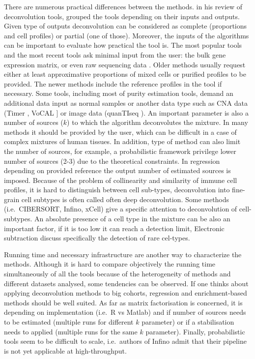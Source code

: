 \documentclass[12pt,]{book}
\theoremstyle{definition}
\theoremstyle{definition}
\theoremstyle{definition}
\theoremstyle{remark}
\begin{document}
There are numerous practical differences between the methods.
\citet{Shen-Orr2013} in his review of deconvolution tools, grouped the
tools depending on their inputs and outputs. Given type of outputs
deconvolution can be considered as complete (proportions and cell
profiles) or partial (one of those). Moreover, the inputs of the
algorithms can be important to evaluate how practical the tool is. The
most popular tools and the most recent tools ask minimal input from the
user: the bulk gene expression matrix, or even raw sequencing data
\citep{Finotello2017}. Older methods usually request either at least
approximative proportions of mixed cells or purified profiles to be
provided. The newer methods include the reference profiles in the tool
if necessary. Some tools, including most of purity estimation tools,
demand an additional data input as normal samples or another data type
such as CNA data (Timer \citep{Li2013}, VoCAL \citep{Steuerman2016}{]}
or image data (quanTIseq \citep{Finotello2017}). An important parameter
is also a number of sources (\(k\)) to which the algorithm deconvolutes
the mixture. In many methods it should be provided by the user, which
can be difficult in a case of complex mixtures of human tissues. In
addition, type of method can also limit the number of sources, for
example, a probabilistic framework privilege lower number of sources
(2-3) due to the theoretical constraints. In regression depending on
provided reference the output number of estimated sources is imposed.
Because of the problem of collinearity and similarity of immune cell
profiles, it is hard to distinguish between cell sub-types,
deconvolution into fine-grain cell subtypes is often called often deep
deconvolution. Some methods (i.e.~CIBERSORT, Infino, xCell) give a
specific attention to deconvolution of cell-subtypes. An absolute
presence of a cell type in the mixture can be also an important factor,
if it is too low it can reach a detection limit, Electronic subtraction
\citep{Gosink2007} discuss specifically the detection of rare cel-types.

Running time and necessary infrastructure are another way to
characterize the methods. Although it is hard to compare objectively the
running time simultaneously of all the tools because of the
heterogeneity of methods and different datasets analysed, some
tendencies can be observed. If one thinks about applying deconvolution
methods to big cohorts, regression and enrichment-based methods should
be well suited. As far as matrix factorisation is concerned, it is
depending on implementation (i.e.~R vs Matlab) and if number of sources
needs to be estimated (multiple runs for different \(k\) parameter) or
if a stabilisation needs to applied (multiple runs for the same \(k\)
parameter). Finally, probabilistic tools seem to be difficult to scale,
i.e.~authors of Infino admit that their pipeline is not yet applicable
at high-throughput.
\end{document}
